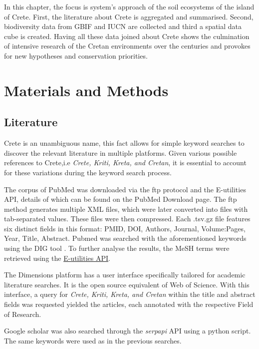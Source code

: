 In this chapter, the focus is system's approach of the soil ecosystems of the island of Crete.
First, the literature about Crete is aggregated and summarised. Second, biodiversity data
from GBIF and IUCN \parencite{iucn2024} are collected and third a spatial data cube is created. 
Having all these data joined about Crete shows the culmination of intensive 
research of the Cretan environments over the centuries and provokes for new
hypotheses and conservation priorities.


\section{Materials and Methods}\label{integration_methods}

\subsection{Literature}\label{crete-literature}

Crete is an unambiguous name, this fact allows for simple keyword searches to discover 
the relevant literature in multiple platforms. Given various possible references to Crete,i.e \textit{Crete, Kriti, Kreta, and Cretan},
it is essential to account for these variations during the keyword search process.

The corpus of PubMed was downloaded via the ftp protocol and the E-utilities API, details of which can be found on the PubMed Download page.
The ftp method generates multiple XML files, which were later converted into
files with tab-separated values. These files were then compressed. Each .tsv.gz file
features six distinct fields in this format: PMID, DOI, Authors, Journal, Volume:Pages, Year, Title, Abstract.
Pubmed was searched with the aforementioned keywords using the DIG tool \parencite{fanini2021coupling}. To further 
analyse the results, the MeSH terms were retrieved using the \href{https://www.ncbi.nlm.nih.gov/books/NBK25497/}{E-utilities API}.

The Dimensions platform has a user interface specifically tailored for academic literature searches.
It is the open source equivalent of Web of Science.
With this interface, a query for \textit{Crete, Kriti, Kreta, and Cretan} within
the title and abstract fields was requested yielded the articles, each annotated with the respective Field of Research.

Google scholar was also searched through the \textit{serpapi} API using
a python script. The same keywords were used as in the previous searches.

